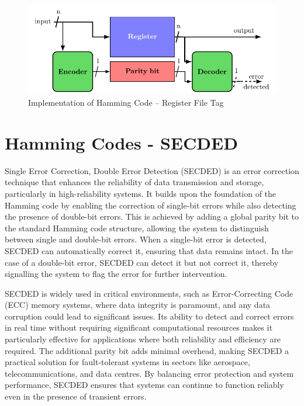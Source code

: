 \begin{figure}[ht]
    \centering
    \includegraphics[page=3, width=\textwidth]{c5_countermeasures_dift/img/archi_contremesures.pdf}
    \caption{Implementation of Hamming Code -- Register File Tag}
    \label{fig:implementation_hc_2}
\end{figure}


\section{Hamming Codes - SECDED}
\label{section:chap5_secded}

Single Error Correction, Double Error Detection (SECDED) is an error correction technique that enhances the reliability of data transmission and storage, particularly in high-reliability systems. It builds upon the foundation of the Hamming code by enabling the correction of single-bit errors while also detecting the presence of double-bit errors. This is achieved by adding a global parity bit to the standard Hamming code structure, allowing the system to distinguish between single and double-bit errors. When a single-bit error is detected, SECDED can automatically correct it, ensuring that data remains intact. In the case of a double-bit error, SECDED can detect it but not correct it, thereby signalling the system to flag the error for further intervention.

SECDED is widely used in critical environments, such as Error-Correcting Code (ECC) memory systems, where data integrity is paramount, and any data corruption could lead to significant issues. Its ability to detect and correct errors in real time without requiring significant computational resources makes it particularly effective for applications where both reliability and efficiency are required. The additional parity bit adds minimal overhead, making SECDED a practical solution for fault-tolerant systems in sectors like aerospace, telecommunications, and data centres. By balancing error protection and system performance, SECDED ensures that systems can continue to function reliably even in the presence of transient errors.

